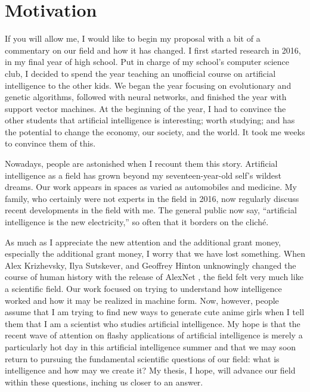 \documentclass[12pt]{report}
\begin{document}
\section{Motivation}

If you will allow me, I would like to begin my proposal with a bit of a commentary on our field and how it has changed.
I first started research in 2016, in my final year of high school.
Put in charge of my school's computer science club, I decided to spend the year teaching an unofficial course on artificial intelligence to the other kids.
We began the year focusing on evolutionary and genetic algorithms, followed with neural networks, and finished the year with support vector machines.
At the beginning of the year, I had to convince the other students that artificial intelligence is interesting; worth studying; and has the potential to change the economy, our society, and the world.
It took me weeks to convince them of this.

Nowadays, people are astonished when I recount them this story.
Artificial intelligence as a field has grown beyond my seventeen-year-old self's wildest dreams.
Our work appears in spaces as varied as automobiles and medicine.
My family, who certainly were not experts in the field in 2016, now regularly discuss recent developments in the field with me.
The general public now say, \enquote{artificial intelligence is the new electricity,} so often that it borders on the cliché.

As much as I appreciate the new attention and the additional grant money, especially the additional grant money, I worry that we have lost something.
When Alex Krizhevsky, Ilya Sutskever, and Geoffrey Hinton unknowingly changed the course of human history with the release of AlexNet \cite{Krizhevsky2012-qe}, the field felt very much like a scientific field.
Our work focused on trying to understand how intelligence worked and how it may be realized in machine form.
Now, however, people assume that I am trying to find new ways to generate cute anime girls when I tell them that I am a scientist who studies artificial intelligence.
My hope is that the recent wave of attention on flashy applications of artificial intelligence is merely a particularly hot day in this artificial intelligence summer and that we may soon return to pursuing the fundamental scientific questions of our field: what is intelligence and how may we create it?
My thesis, I hope, will advance our field within these questions, inching us closer to an answer.
\end{document}
